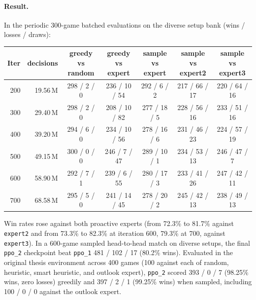 \paragraph{Result.} In the periodic 300-game batched evaluations on the diverse setup bank
(wins / losses / draws):
\begin{center}
\small
\begin{tabular}{rrccccc}
\toprule
Iter & decisions & greedy vs random & greedy vs expert & sample vs expert & sample vs expert2 & sample vs expert3 \\
\midrule
200 & 19.56\,M & 298 / 2 / 0 & 236 / 10 / 54 & 292 / 6 / 2  & 217 / 66 / 17 & 220 / 64 / 16 \\
300 & 29.40\,M & 298 / 2 / 0 & 208 / 10 / 82 & 277 / 18 / 5 & 228 / 56 / 16 & 233 / 51 / 16 \\
400 & 39.20\,M & 294 / 6 / 0 & 234 / 10 / 56 & 278 / 16 / 6 & 231 / 46 / 23 & 224 / 57 / 19 \\
500 & 49.15\,M & 300 / 0 / 0 & 246 / 7 / 47  & 289 / 10 / 1 & 234 / 53 / 13 & 246 / 47 / 7  \\
600 & 58.90\,M & 292 / 7 / 1 & 239 / 6 / 55  & 280 / 17 / 3 & 233 / 41 / 26 & 247 / 42 / 11 \\
700 & 68.58\,M & 295 / 5 / 0 & 241 / 14 / 45 & 278 / 20 / 2 & 245 / 42 / 13 & 238 / 49 / 13 \\
\bottomrule
\end{tabular}
\end{center}
Win rates rose against both proactive experts (from 72.3\% to 81.7\% against \texttt{expert2} and
from 73.3\% to 82.3\% at iteration 600, 79.3\% at 700, against \texttt{expert3}). In a 600-game
sampled head-to-head match on diverse setups, the final \texttt{ppo\_2} checkpoint beat
\texttt{ppo\_1} 481 / 102 / 17 (80.2\% wins). Evaluated in the original thesis environment across
400 games (100 against each of random, heuristic, smart heuristic, and outlook expert),
\texttt{ppo\_2} scored 393 / 0 / 7 (98.25\% wins, zero losses) greedily and 397 / 2 / 1 (99.25\%
wins) when sampled, including 100 / 0 / 0 against the outlook expert.

